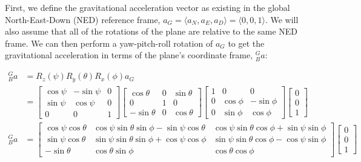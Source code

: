 First, we define the gravitational acceleration vector as existing in the global North-East-Down (NED) reference frame, $a_G = \langle a_N, a_E, a_D \rangle = \langle 0, 0, 1 \rangle$.
We will also assume that all of the rotations of the plane are relative to the same NED frame.
We can then perform a yaw-pitch-roll rotation of $a_G$ to get the gravitational acceleration in terms of the plane's coordinate frame, ${}^G_B a$:

\begin{align*}
    {}^G_B a &= R_z(\psi) R_y(\theta) R_x(\phi) a_G \\
    &= 
    \left[
        \begin{matrix}
            \cos\psi & -\sin\psi & 0 \\
            \sin\psi & \cos\psi & 0 \\
            0 & 0 & 1
        \end{matrix}
    \right]
    \left[
        \begin{matrix}
            \cos\theta & 0 & \sin\theta \\
            0 & 1 & 0 \\
            -\sin\theta & 0 & \cos\theta
        \end{matrix}
    \right]
    \left[
        \begin{matrix}
            1 & 0 & 0 \\
            0 & \cos\phi & -\sin\phi \\
            0 & \sin\phi & \cos\phi 
        \end{matrix}
    \right] 
    \left[
        \begin{matrix}
            0 \\
            0 \\
            1
        \end{matrix}
    \right]\\
    {}^G_B a &= 
    \left[
        \begin{matrix}
            \cos\psi\cos\theta & \cos\psi\sin\theta\sin\phi-\sin\psi\cos\theta & \cos\psi\sin\theta\cos\phi+\sin\psi\sin\phi \\
            \sin\psi\cos\theta & \sin\psi\sin\theta\sin\phi+\cos\psi\cos\phi & \sin\psi\sin\theta\cos\phi-\cos\psi\sin\phi \\
            -\sin\theta & \cos\theta\sin\phi & \cos\theta\cos\phi
        \end{matrix}
    \right]
    \left[
        \begin{matrix}
            0 \\
            0 \\
            1
        \end{matrix}
    \right]
\end{align*}
